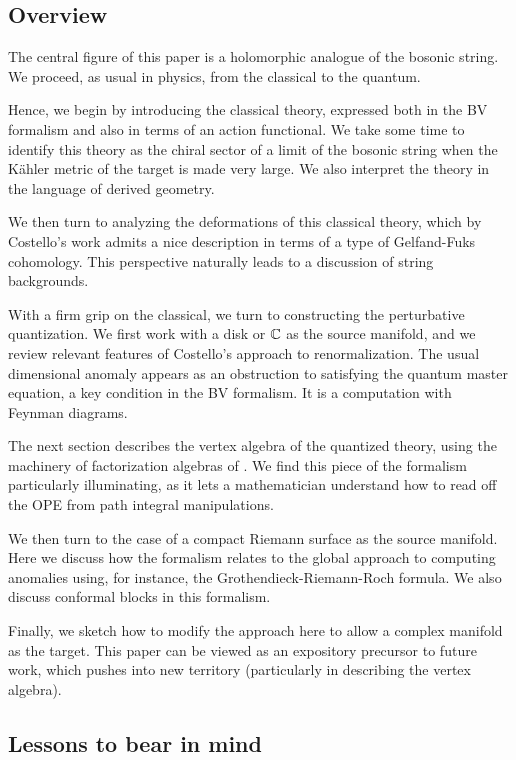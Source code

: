 \subsection{Overview}

The central figure of this paper is a holomorphic analogue of the bosonic string.
We proceed, as usual in physics, from the classical to the quantum.

Hence, we begin by introducing the classical theory, 
expressed both in the BV formalism and also in terms of an action functional.
We take some time to identify this theory as the chiral sector of a limit of the bosonic string when the K\"{a}hler metric of the target is made very large. 
We also interpret the theory in the language of derived geometry.

We then turn to analyzing the deformations of this classical theory,
which by Costello's work admits a nice description in terms of a type of Gelfand-Fuks cohomology.
This perspective naturally leads to a discussion of string backgrounds.

With a firm grip on the classical, we turn to constructing the perturbative quantization.
We first work with a disk or $\mathbb C$ as the source manifold,
and we review relevant features of Costello's approach to renormalization.
The usual dimensional  anomaly appears as an obstruction to satisfying the quantum master equation,
a key condition in the BV formalism.
It is a computation with Feynman diagrams.

The next section describes the vertex algebra of the quantized theory,
using the machinery of factorization algebras of \cite{CG1, CG2}.
We find this piece of the formalism particularly illuminating,
as it lets a mathematician understand how to read off the OPE from path integral manipulations.

We then turn to the case of a compact Riemann surface as the source manifold.
Here we discuss how the formalism relates to the global approach to computing anomalies using, for instance, the Grothendieck-Riemann-Roch formula.
We also discuss conformal blocks in this formalism.

Finally, we sketch how to modify the approach here to allow a complex manifold as the target.
This paper can be viewed as an expository precursor to future work,
which pushes into new territory (particularly in describing the vertex algebra).

\subsection{Lessons to bear in mind}

